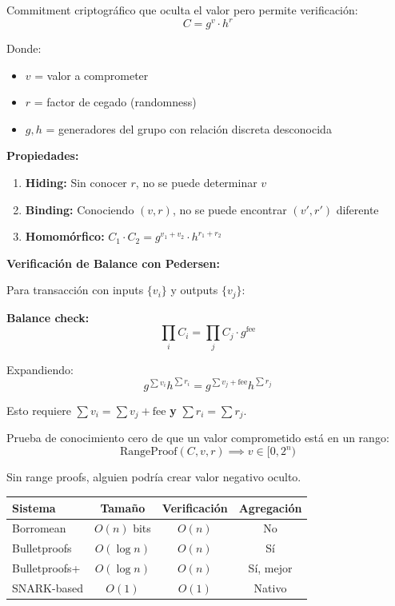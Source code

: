 \documentclass[11pt,a4paper,twoside]{book}
\begin{document}
\begin{definition}
Commitment criptogr\'afico que oculta el valor pero permite verificaci\'on:
\[
C = g^v \cdot h^r
\]

Donde:
\begin{itemize}
    \item $v$ = valor a comprometer
    \item $r$ = factor de cegado (randomness)
    \item $g, h$ = generadores del grupo con relaci\'on discreta desconocida
\end{itemize}

\textbf{Propiedades:}
\begin{enumerate}
    \item \textbf{Hiding:} Sin conocer $r$, no se puede determinar $v$
    \item \textbf{Binding:} Conociendo $(v, r)$, no se puede encontrar $(v', r')$ diferente
    \item \textbf{Homom\'orfico:} $C_1 \cdot C_2 = g^{v_1+v_2} \cdot h^{r_1+r_2}$
\end{enumerate}
\end{definition}

\begin{mathnote}
\textbf{Verificaci\'on de Balance con Pedersen:}

Para transacci\'on con inputs $\{v_i\}$ y outputs $\{v_j\}$:

\textbf{Balance check:}
\[
\prod_i C_i = \prod_j C_j \cdot g^{\text{fee}}
\]

Expandiendo:
\[
g^{\sum v_i} h^{\sum r_i} = g^{\sum v_j + \text{fee}} h^{\sum r_j}
\]

Esto requiere $\sum v_i = \sum v_j + \text{fee}$ \textbf{y} $\sum r_i = \sum r_j$.
\end{mathnote}

\begin{definition}
Prueba de conocimiento cero de que un valor comprometido est\'a en un rango:
\[
\text{RangeProof}(C, v, r) \implies v \in [0, 2^n)
\]

Sin range proofs, alguien podr\'ia crear valor negativo oculto.
\end{definition}

\begin{center}
\begin{tabular}{lccc}
\toprule
\textbf{Sistema} & \textbf{Tama\~no} & \textbf{Verificaci\'on} & \textbf{Agregaci\'on} \\
\midrule
Borromean & $O(n)$ bits & $O(n)$ & No \\
Bulletproofs & $O(\log n)$ & $O(n)$ & S\'i \\
Bulletproofs+ & $O(\log n)$ & $O(n)$ & S\'i, mejor \\
SNARK-based & $O(1)$ & $O(1)$ & Nativo \\
\bottomrule
\end{tabular}
\end{center}
\end{document}
